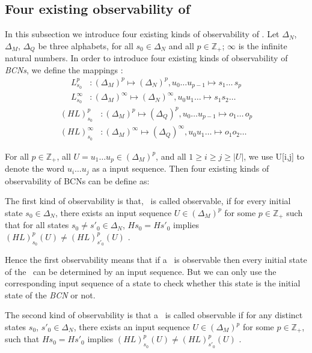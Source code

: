 \subsection{Four existing observability of \BCNs}
In this subsection we introduce four existing kinds of observability of \BCNs. Let $\Delta_N$, $\Delta_M$, $\Delta_Q$ be three alphabets, for all $s_0\in \Delta_N$ and all $p\in \mathbb{Z}_+$; $\infty$ is the infinite natural numbers. In order to introduce four existing kinds of observability of {\em BCNs}, we define the mappings \cite{Zhang2016Observability}:
\begin{equation}
\begin{split}
L^p_{s_0} &: (\Delta_M)^p\mapsto(\Delta_N)^p, u_0\ldots u_{p-1} \mapsto s_1 \ldots\, s_p\\
L^{\infty}_{s_0} &: (\Delta_M)^{\infty}\mapsto(\Delta_N)^{\infty}, u_0 u_1 \ldots  \mapsto s_1 s_2 \ldots
\end{split}
\end{equation}
\begin{equation}
\begin{split}
(HL)^p_{s_0} &: (\Delta_M)^p\mapsto(\Delta_Q)^p, u_0\ldots u_{p-1} \mapsto o_1\ldots\, o_p\\
(HL)^{\infty}_{s_0} &: (\Delta_M)^{\infty}\mapsto(\Delta_Q)^{\infty}, u_0 u_1 \ldots  \mapsto o_1 o_2\ldots
\end{split}
\end{equation}

For all  $p\in \mathbb{Z}_+$, all $U=u_1 \ldots u_p \in(\Delta_M)^p$, and all $1\ge i \ge j \ge |U|$, we use U[i,j] to denote the word $u_i \ldots u_j$ as a input sequence. Then four existing kinds of observability of BCNs can be define as: 
\begin{definition}
The first kind of observability is that, \BCN\ is called observable, if for every initial state $s_0 \in \Delta_N$, there exists an input sequence $U\in(\Delta_M)^p$ for some $p\in \mathbb{Z}_+$ such that for all states $s_0\neq {s'}_0\in \Delta_N$, $Hs_0=H{s'}_0$ implies $(HL)^p_{s_0}(U)\neq (HL)^p_{{s'}_0}(U)$ \cite{cheng2009controllability}.
\end{definition}

Hence the first observability means that if a \BCN\ is observable then every initial state of the \BCN\ can be determined by an input sequence. But we can only use the corresponding input sequence of a state to check whether this state is the initial state of the {\em BCN} or not.
\begin{definition}
	The second kind of observability is that a \BCN\ is called observable if for any distinct states $s_0$, ${s'}_0 \in \Delta_N$, there exists an input sequence $U\in(\Delta_M)^p$ for some $p\in \mathbb{Z}_+$, such that $Hs_0=H{s'}_0$ implies $(HL)^p_{s_0}(U)\neq (HL)^p_{{s'}_0}(U)$ \cite{Zhao2010Input}.
\end{definition}

